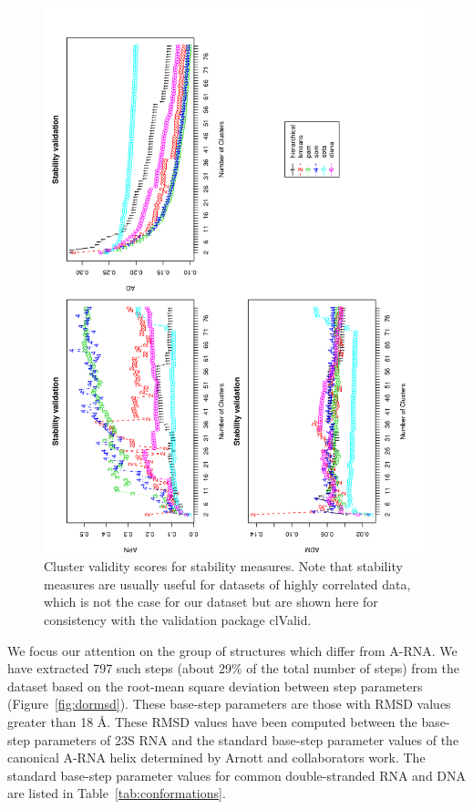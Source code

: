 \begin{figure}
 \centering
\includegraphics[angle=0, scale=0.38]{Chapter2/STval_sta.png}
\caption{Cluster  validity scores  for stability  measures.  Note that
  stability  measures  are  usually  useful  for  datasets  of  highly
  correlated data, which is not the case for our dataset but are shown
  here for consistency with the validation package clValid.}
 \label{fig:stability}
\end{figure}

We focus  our attention on the  group of structures  which differ from
A-RNA.  We have  extracted 797  such steps  (about 29\%  of  the total
number  of steps)  from  the  dataset based  on  the root-mean  square
deviation  between  step  parameters (Figure~\ref{fig:dormsd}).  These
base-step parameters are  those with RMSD values greater  than 18 \AA.
These RMSD values have  been computed between the base-step parameters
of  23S  RNA  and  the  standard base-step  parameter  values  of  the
canonical   A-RNA  helix  determined   by  Arnott   and  collaborators
\cite{arnott1973}  work. The standard  base-step parameter  values for
common    double-stranded    RNA     and    DNA    are    listed    in
Table~\ref{tab:conformations}.

